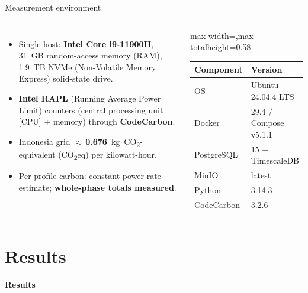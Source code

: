 \documentclass[aspectratio=169, table]{beamer}
\newcommand{\sectionframe}[1]{%
  \begin{frame}{\hfill}\centering\Huge{\textbf{#1}}\end{frame}}
\newcommand{\takeaway}[1]{\vspace{3pt}{\footnotesize #1}}
\newenvironment{fittable}[1][0.66]
  {\begin{center}\arrayrulecolor{black}\footnotesize
   \begin{adjustbox}{max width=\linewidth,max totalheight=#1\textheight}}
  {\end{adjustbox}\end{center}}
\begin{document}
\begin{frame}{Measurement environment}
  \vspace{2pt}\footnotesize
  \begin{columns}[t]
    \begin{itemize}\setlength{\itemsep}{2.5pt}
      \item Single host: \textbf{Intel Core i9-11900H}, 31~GB random-access memory (RAM), 1.9~TB NVMe (Non-Volatile Memory Express) solid-state drive.
      \item \textbf{Intel RAPL} (Running Average Power Limit) counters (central processing unit [CPU] $+$ memory) through \textbf{CodeCarbon}.
      \item Indonesia grid $\approx$\,\textbf{0.676}~kg~CO\textsubscript{2}-equivalent (CO\textsubscript{2}eq) per kilowatt-hour.
      \item Per-profile carbon: constant power-rate estimate; \textbf{whole-phase totals measured}.
    \end{itemize}
    \begin{fittable}[0.58]
    \begin{tabular}{ll}\toprule
      \textbf{Component} & \textbf{Version} \\\midrule
      OS         & Ubuntu 24.04.4 LTS \\
      Docker     & 29.4 / Compose v5.1.1 \\
      PostgreSQL & 15 + TimescaleDB \\
      MinIO      & latest \\
      Python     & 3.14.3 \\
      CodeCarbon & 3.2.6 \\\bottomrule
    \end{tabular}\end{fittable}
  \end{columns}
  \takeaway{Hardware-level energy; identical conditions for both architectures.}
\end{frame}

\section{Results}
\sectionframe{Results}
\end{document}
